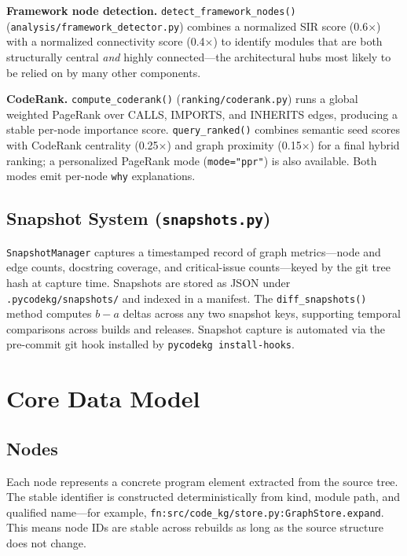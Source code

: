\documentclass[10pt]{article}
\begin{document}
\textbf{Framework node detection.}
\texttt{detect\_framework\_nodes()} (\texttt{analysis/framework\_detector.py})
combines a normalized SIR score (0.6$\times$) with a normalized connectivity
score (0.4$\times$) to identify modules that are both structurally central
\emph{and} highly connected---the architectural hubs most likely to be relied
on by many other components.

\textbf{CodeRank.}
\texttt{compute\_coderank()} (\texttt{ranking/coderank.py}) runs a global weighted
PageRank over CALLS, IMPORTS, and INHERITS edges, producing a stable per-node
importance score.  \texttt{query\_ranked()} combines semantic seed scores with
CodeRank centrality (0.25$\times$) and graph proximity (0.15$\times$) for a final
hybrid ranking; a personalized PageRank mode (\texttt{mode="ppr"}) is also
available.  Both modes emit per-node \texttt{why} explanations.

\subsection{Snapshot System (\texttt{snapshots.py})}

\texttt{SnapshotManager} captures a timestamped record of graph metrics---node
and edge counts, docstring coverage, and critical-issue counts---keyed by the
git tree hash at capture time.  Snapshots are stored as JSON under
\texttt{.pycodekg/snapshots/} and indexed in a manifest.  The \texttt{diff\_snapshots()}
method computes $b - a$ deltas across any two snapshot keys, supporting temporal
comparisons across builds and releases.  Snapshot capture is automated via the
pre-commit git hook installed by \texttt{pycodekg install-hooks}.

\section{Core Data Model}

\subsection{Nodes}

Each node represents a concrete program element extracted from the source tree.
The stable identifier is constructed deterministically from kind, module path, and
qualified name---for example, \texttt{fn:src/code\_kg/\allowbreak store.py:\allowbreak GraphStore.expand}.
This means node IDs are stable across rebuilds as long as the source structure
does not change.
\end{document}
